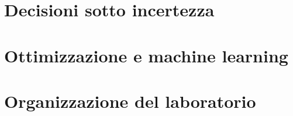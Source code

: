 \documentclass[11pt,a4paper,oneside]{book}
\begin{document}
\part{Decisioni sotto incertezza}



\part{Ottimizzazione e machine learning}


\part{Organizzazione del laboratorio}

\end{document}
